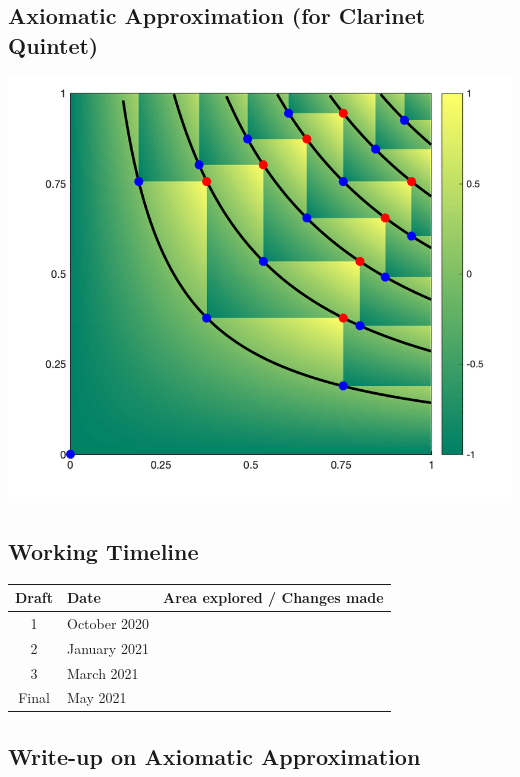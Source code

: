 \documentclass{article}
\begin{document}

\begin{center}
\vspace*{\fill}
\LARGE
    \section{Axiomatic Approximation (for Clarinet Quintet)}
    \includegraphics[width=\textwidth]{approximation.png}
\vspace*{\fill}
\end{center}

\newpage

\subsection{Working Timeline}
\begin{center}
	\def\arraystretch{1.5}
\begin{tabular}{|c|l|l|}
	\hline
	Draft&Date&Area explored / Changes made\\
	\hline
	1&October 2020&\\
	\hline
	2&January 2021&\\
	\hline
	3&March 2021&\\
	\hline
	Final&May 2021&\\
	\hline
\end{tabular}
\end{center}

\subsection{Write-up on {\bf Axiomatic Approximation}}
\end{document}
